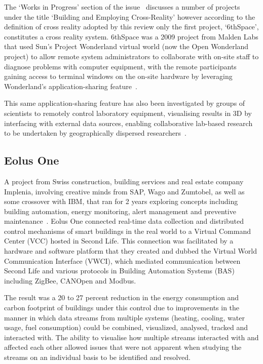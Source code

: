 The `Works in Progress' section of the issue~\cite{Yankelovich2009} discusses a number of projects under the title `Building and Employing Cross-Reality' however according to the definition of cross reality adopted by this review only the first project, `6thSpace', constitutes a cross reality system. 6thSpace was a 2009 project from Malden Labs that used Sun's Project Wonderland virtual world (now the Open Wonderland project) to allow remote system administrators to collaborate with on-site staff to diagnose problems with computer equipment, with the remote participants gaining access to terminal windows on the on-site hardware by leveraging Wonderland's application-sharing feature~\cite{Yankelovich2009}.
	
This same application-sharing feature has also been investigated by groups of scientists to remotely control laboratory equipment, visualising results in 3D by interfacing with external data sources, enabling collaborative lab-based research to be undertaken by geographically dispersed researchers~\cite{Fayolle2011}.

\subsection{Eolus One}
\label{subsec:eolus_one}
A project from Swiss construction, building services and real estate company Implenia, involving creative minds from SAP, Wago and Zumtobel, as well as some crossover with IBM, that ran for 2 years exploring concepts including building automation, energy monitoring, alert management and preventive maintenance~\cite{Coleman2009, UgoTrade2007}. Eolus One connected real-time data collection and distributed control mechanisms of smart buildings in the real world to a Virtual Command Center (VCC) hosted in Second Life. This connection was facilitated by a hardware and software platform that they created and dubbed the Virtual World Communication Interface (VWCI), which mediated communication between Second Life and various protocols in Building Automation Systems (BAS) including ZigBee, CANOpen and Modbus.

The result was a 20 to 27 percent reduction in the energy consumption and carbon footprint of buildings under this control due to improvements in the manner in which data streams from multiple systems (heating, cooling, water usage, fuel consumption) could be combined, visualized, analysed, tracked and interacted with. The ability to visualise how multiple streams interacted with and affected each other allowed issues that were not apparent when studying the streams on an individual basis to be identified and resolved.

